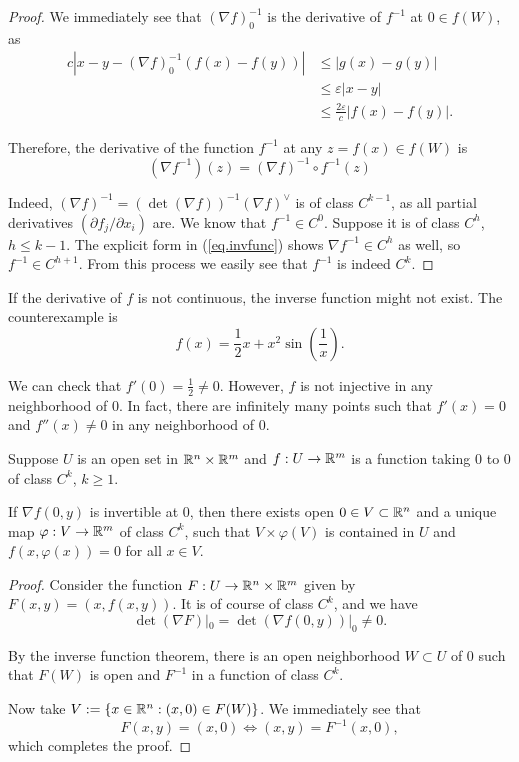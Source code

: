\begin{proof}
    We immediately see that $(\nabla f)_0^{-1}$ is the derivative of $f^{-1}$ at $0\in f(W)$, as
    \begin{align*}
        c|x-y-(\nabla f)_0^{-1}(f(x)-f(y))| &\leq |g(x)-g(y)| \\
        &\leq\varepsilon|x-y| \\
        &\leq\frac{2\varepsilon}{c}|f(x)-f(y)|.
    \end{align*}

    Therefore, the derivative of the function $f^{-1}$ at any $z=f(x)\in f(W)$ is 
    \begin{equation}\label{eq.invfunc}
        (\nabla f^{-1})(z)=(\nabla f)^{-1}\circ f^{-1}(z)
    \end{equation}

    Indeed, $(\nabla f)^{-1}=(\det(\nabla f))^{-1}(\nabla f)^\vee$ is of class $C^{k-1}$, as all partial derivatives $(\partial f_j/\partial x_i)$ are. We know that $f^{-1}\in C^0$. Suppose it is of class $C^h$, $h\leq k-1$. The explicit form in (\ref{eq.invfunc}) shows $\nabla f^{-1}\in C^h$ as well, so $f^{-1}\in C^{h+1}$. From this process we easily see that $f^{-1}$ is indeed $C^k$.
\end{proof}

\begin{example}
    If the derivative of $f$ is not continuous, the inverse function might not exist. The counterexample is 
    $$f(x)=\frac{1}{2}x+x^2\sin(\frac{1}{x}).$$

    We can check that $f'(0)=\frac{1}{2}\neq 0$. However, $f$ is not injective in any neighborhood of $0$. In fact, there are infinitely many points such that $f'(x)=0$ and $f''(x)\neq 0$ in any neighborhood of $0$.
\end{example}

\begin{theorem}\label{thm.impfunc}
    Suppose $U$ is an open set in $\mathbb{R}^n\times\mathbb{R}^m$ and $f:U\to\mathbb{R}^m$ is a function taking $0$ to $0$ of class $C^k$, $k\geq 1$.

    If $\nabla f(0,y)$ is invertible at $0$, then there exists open $0\in V\subset\mathbb{R}^n$ and a unique map $\varphi:V\to\mathbb{R}^m$ of class $C^k$, such that $V\times\varphi(V)$ is contained in $U$ and $f(x,\varphi(x))=0$ for all $x\in V$. 
\end{theorem}

\begin{proof}
    Consider the function $F:U\to\mathbb{R}^n\times\mathbb{R}^m$ given by $F(x,y)=(x,f(x,y))$. It is of course of class $C^k$, and we have 
    $$\det(\nabla F)|_0=\det(\nabla f(0,y))|_0\neq 0.$$

    By the inverse function theorem, there is an open neighborhood $W\subset U$ of $0$ such that $F(W)$ is open and $F^{-1}$ in a function of class $C^k$.

    Now take $V:=\{x\in\mathbb{R}^n:(x,0)\in F(W)\}$. We immediately see that
    $$F(x,y)=(x,0) \Longleftrightarrow (x,y)=F^{-1}(x,0),$$
    which completes the proof.
\end{proof}

